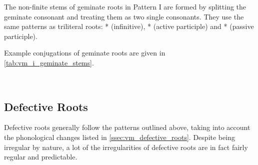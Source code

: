 \documentclass[grammar]{subfiles}
\begin{document}
The non-finite stems of geminate roots in Pattern I are formed by splitting the
geminate consonant and treating them as two single consonants.  They use the
same patterns as triliteral roots:  * (infinitive), *
(active participle) and * (passive participle). 

Example conjugations of geminate roots are given in
\cref{tab:vm_i_geminate_stems}.


\begin{table}[h!]\small\capstart
  \centering
  \\
  \caption{Pattern I geminate stems \label{tab:vm_i_geminate_stems}}
\end{table}


\subsection{Defective Roots}
\label{ssec:vm_i_defective}

Defective roots generally follow the patterns outlined above, taking into
account the phonological changes listed in \cref{ssec:vm_defective_roots}.
Despite being irregular by nature, a lot of the irregularities of defective
roots are in fact fairly regular and predictable. 
\end{document}
